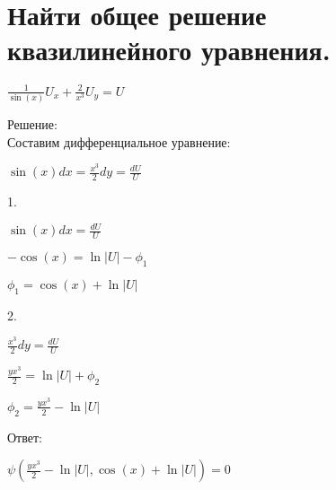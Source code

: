 \documentclass{article}
\begin{document}
	\section{Найти общее решение квазилинейного уравнения.}
	\begin{center}
		$ \frac{1}{\sin(x)}U_x + \frac{2}{x^3}U_y = U $
	\end{center}
	Решение: \\
	Составим дифференциальное уравнение: \\
	\begin{center}
		$ \sin(x)dx = \frac{x^3}{2}dy = \frac{dU}{U} $
	\end{center}
	1. \\
	\begin{center}
		$ \sin(x)dx = \frac{dU}{U} $
	\end{center}
	\begin{center}
		$ -\cos(x) = \ln{ \lvert U \lvert} - \phi_1 $
	\end{center}
	\begin{center}
		$ \phi_1 = \cos(x) + \ln{ \lvert U \lvert} $
	\end{center}
	2. \\
	\begin{center}
		$ \frac{x^3}{2}dy = \frac{dU}{U} $
	\end{center}
	\begin{center}
		$ \frac{y x^3}{2} = \ln{ \lvert U \lvert} + \phi_2 $
	\end{center}
	\begin{center}
		$ \phi_2 = \frac{y x^3}{2} - \ln{ \lvert U \lvert} $
	\end{center}
	Ответ:
	\begin{center}
		$ \psi(\frac{y x^3}{2} - \ln{ \lvert U \lvert}, \cos(x) + \ln{ \lvert U \lvert})  = 0$
	\end{center}

	\newpage
\end{document}
